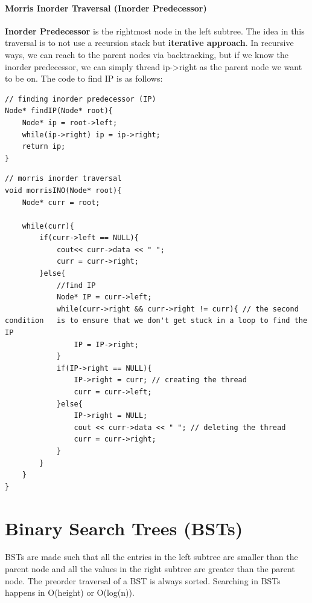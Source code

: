 \documentclass[11pt]{article}
\begin{document}
\paragraph{Morris Inorder Traversal (Inorder Predecessor)}
\textbf{Inorder Predecessor} is the rightmost node in the left subtree. The idea in this traversal is to not use a recursion stack but \textbf{iterative approach}. In recursive ways, we can reach to the parent nodes via backtracking, but if we know the inorder predecessor, we can simply thread ip->right as the parent node we want to be on. The code to find IP is as follows:

\begin{minipage}{\linewidth}
\begin{lstlisting}
// finding inorder predecessor (IP)
Node* findIP(Node* root){
	Node* ip = root->left;
	while(ip->right) ip = ip->right;
	return ip;
}
\end{lstlisting}
\end{minipage}

\begin{minipage}{\linewidth}
\begin{lstlisting}
// morris inorder traversal
void morrisINO(Node* root){
	Node* curr = root;

	while(curr){
		if(curr->left == NULL){
			cout<< curr->data << " ";
			curr = curr->right;
		}else{
			//find IP
			Node* IP = curr->left;
			while(curr->right && curr->right != curr){ // the second condition   is to ensure that we don't get stuck in a loop to find the IP
				IP = IP->right;
			}
			if(IP->right == NULL){
				IP->right = curr; // creating the thread
				curr = curr->left;
			}else{
				IP->right = NULL;
				cout << curr->data << " "; // deleting the thread
				curr = curr->right;
			}
		}
	}
}
\end{lstlisting}
\end{minipage}

\section{Binary Search Trees (BSTs)}

BSTs are made such that all the entries in the left subtree are smaller than the parent node and all the values in the right subtree are greater than the parent node. The preorder traversal of a BST is always sorted. Searching in BSTs happens in O(height) or O(log(n)).
\end{document}
